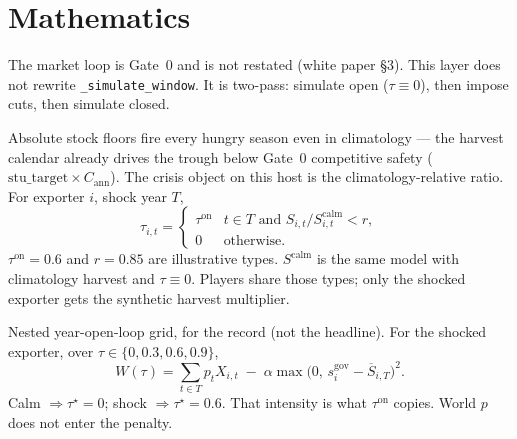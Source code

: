 \section{Mathematics}
\label{sec:math}

The market loop is Gate~0 and is not restated (white paper \S3). This
layer does not rewrite \texttt{\_simulate\_window}. It is two-pass: simulate
open (\(\tau\equiv 0\)), then impose cuts, then simulate closed.

Absolute stock floors fire every hungry season even in climatology --- the
harvest calendar already drives the trough below Gate~0 competitive safety
(\(\mathrm{stu\_target}\times C_{\mathrm{ann}}\)). The crisis object on
this host is the climatology-relative ratio. For exporter \(i\), shock year
\(T\),
\begin{equation}
\label{eq:tau}
\tau_{i,t}
=
\begin{cases}
\tau^{\mathrm{on}} & t\in T \text{ and } S_{i,t}/S^{\mathrm{calm}}_{i,t} < r, \\
0 & \text{otherwise.}
\end{cases}
\end{equation}
\(\tau^{\mathrm{on}}=0.6\) and \(r=0.85\) are illustrative types.
\(S^{\mathrm{calm}}\) is the same model with climatology harvest and
\(\tau\equiv 0\). Players share those types; only the shocked exporter
gets the synthetic harvest multiplier.

Nested year-open-loop grid, for the record (not the headline). For the
shocked exporter, over \(\tau\in\{0,0.3,0.6,0.9\}\),
\begin{equation}
\label{eq:W}
W(\tau)=\sum_{t\in T} p_t X_{i,t}
\;-\;
\alpha\max\bigl(0,\, s^{\mathrm{gov}}_i-\overline{S}_{i,T}\bigr)^2.
\end{equation}
Calm \(\Rightarrow \tau^\star=0\); shock \(\Rightarrow \tau^\star=0.6\).
That intensity is what \(\tau^{\mathrm{on}}\) copies. World \(p\) does not
enter the penalty.

